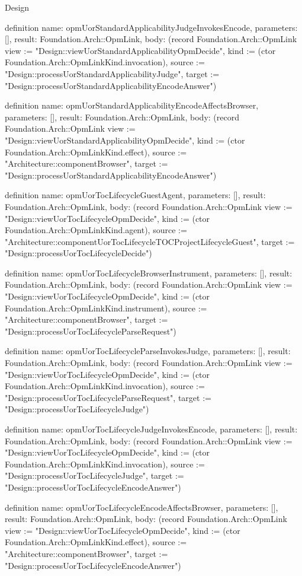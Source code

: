 \begin{lexlean}{Design}
\begin{semanticmodule}
definition{
  name: opmUorStandardApplicabilityJudgeInvokesEncode,
  parameters: [],
  result: Foundation.Arch::OpmLink,
  body: (record Foundation.Arch::OpmLink {view := "Design::viewUorStandardApplicabilityOpmDecide", kind := (ctor Foundation.Arch::OpmLinkKind.invocation), source := "Design::processUorStandardApplicabilityJudge", target := "Design::processUorStandardApplicabilityEncodeAnswer"})
}

definition{
  name: opmUorStandardApplicabilityEncodeAffectsBrowser,
  parameters: [],
  result: Foundation.Arch::OpmLink,
  body: (record Foundation.Arch::OpmLink {view := "Design::viewUorStandardApplicabilityOpmDecide", kind := (ctor Foundation.Arch::OpmLinkKind.effect), source := "Architecture::componentBrowser", target := "Design::processUorStandardApplicabilityEncodeAnswer"})
}

definition{
  name: opmUorTocLifecycleGuestAgent,
  parameters: [],
  result: Foundation.Arch::OpmLink,
  body: (record Foundation.Arch::OpmLink {view := "Design::viewUorTocLifecycleOpmDecide", kind := (ctor Foundation.Arch::OpmLinkKind.agent), source := "Architecture::componentUorTocLifecycleTOCProjectLifecycleGuest", target := "Design::processUorTocLifecycleDecide"})
}

definition{
  name: opmUorTocLifecycleBrowserInstrument,
  parameters: [],
  result: Foundation.Arch::OpmLink,
  body: (record Foundation.Arch::OpmLink {view := "Design::viewUorTocLifecycleOpmDecide", kind := (ctor Foundation.Arch::OpmLinkKind.instrument), source := "Architecture::componentBrowser", target := "Design::processUorTocLifecycleParseRequest"})
}

definition{
  name: opmUorTocLifecycleParseInvokesJudge,
  parameters: [],
  result: Foundation.Arch::OpmLink,
  body: (record Foundation.Arch::OpmLink {view := "Design::viewUorTocLifecycleOpmDecide", kind := (ctor Foundation.Arch::OpmLinkKind.invocation), source := "Design::processUorTocLifecycleParseRequest", target := "Design::processUorTocLifecycleJudge"})
}

definition{
  name: opmUorTocLifecycleJudgeInvokesEncode,
  parameters: [],
  result: Foundation.Arch::OpmLink,
  body: (record Foundation.Arch::OpmLink {view := "Design::viewUorTocLifecycleOpmDecide", kind := (ctor Foundation.Arch::OpmLinkKind.invocation), source := "Design::processUorTocLifecycleJudge", target := "Design::processUorTocLifecycleEncodeAnswer"})
}

definition{
  name: opmUorTocLifecycleEncodeAffectsBrowser,
  parameters: [],
  result: Foundation.Arch::OpmLink,
  body: (record Foundation.Arch::OpmLink {view := "Design::viewUorTocLifecycleOpmDecide", kind := (ctor Foundation.Arch::OpmLinkKind.effect), source := "Architecture::componentBrowser", target := "Design::processUorTocLifecycleEncodeAnswer"})
}


\end{semanticmodule}
\end{lexlean}
